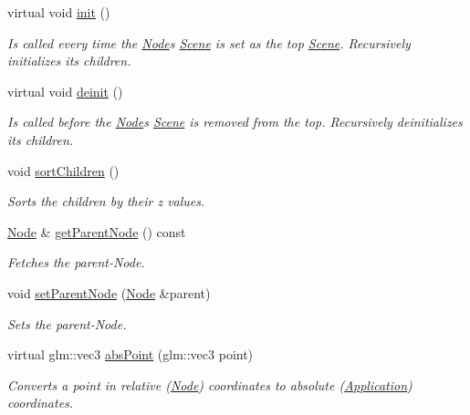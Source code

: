 \begin{DoxyCompactItemize}
\item 
virtual void \mbox{\hyperlink{classsage_1_1Node_ab87776adae83149e235e37ed469f4e10}{init}} ()
\begin{DoxyCompactList}\small\item\em Is called every time the \mbox{\hyperlink{classsage_1_1Node}{Node}}\textquotesingle{}s \mbox{\hyperlink{classsage_1_1Scene}{Scene}} is set as the top \mbox{\hyperlink{classsage_1_1Scene}{Scene}}. Recursively initializes its children. \end{DoxyCompactList}\item 
virtual void \mbox{\hyperlink{classsage_1_1Node_a726445f512453846694fd36ffa615b22}{deinit}} ()
\begin{DoxyCompactList}\small\item\em Is called before the \mbox{\hyperlink{classsage_1_1Node}{Node}}\textquotesingle{}s \mbox{\hyperlink{classsage_1_1Scene}{Scene}} is removed from the top. Recursively deinitializes its children. \end{DoxyCompactList}\item 
void \mbox{\hyperlink{classsage_1_1Node_aa7d796f1bad7d0e23a4cdd2575b4b9f3}{sort\+Children}} ()
\begin{DoxyCompactList}\small\item\em Sorts the children by their z values. \end{DoxyCompactList}\item 
\mbox{\hyperlink{classsage_1_1Node}{Node}} \& \mbox{\hyperlink{classsage_1_1Node_a250bbfa6108773d1035f4bd61441fdd0}{get\+Parent\+Node}} () const
\begin{DoxyCompactList}\small\item\em Fetches the parent-\/\+Node. \end{DoxyCompactList}\item 
void \mbox{\hyperlink{classsage_1_1Node_abc36311ef7bb8ba6380d403b577fff90}{set\+Parent\+Node}} (\mbox{\hyperlink{classsage_1_1Node}{Node}} \&parent)
\begin{DoxyCompactList}\small\item\em Sets the parent-\/\+Node. \end{DoxyCompactList}\item 
virtual glm\+::vec3 \mbox{\hyperlink{classsage_1_1Node_a708c034b5b9d316265309a3a46811a06}{abs\+Point}} (glm\+::vec3 point)
\begin{DoxyCompactList}\small\item\em Converts a point in relative (\mbox{\hyperlink{classsage_1_1Node}{Node}}) coordinates to absolute (\mbox{\hyperlink{classsage_1_1Application}{Application}}) coordinates. \end{DoxyCompactList}\item 

\end{DoxyCompactItemize}
